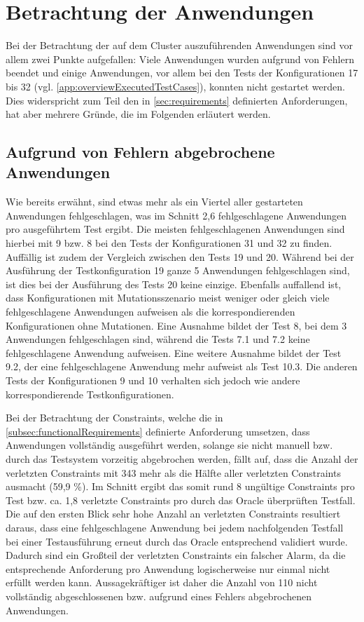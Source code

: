 \section{Betrachtung der Anwendungen}
\label{sec:appEval}

Bei der Betrachtung der auf dem Cluster auszuführenden Anwendungen sind vor allem zwei Punkte aufgefallen:
Viele Anwendungen wurden aufgrund von Fehlern beendet und einige Anwendungen, vor allem bei den Tests der Konfigurationen 17 bis 32 (vgl. \cref{app:overviewExecutedTestCases}), konnten nicht gestartet werden.
Dies widerspricht zum Teil den in \cref{sec:requirements} definierten Anforderungen, hat aber mehrere Gründe, die im Folgenden erläutert werden.

\subsection{Aufgrund von Fehlern abgebrochene Anwendungen}
\label{subsec:failedApps}

Wie bereits erwähnt, sind etwas mehr als ein Viertel aller gestarteten Anwendungen fehlgeschlagen, was im Schnitt 2,6 fehlgeschlagene Anwendungen pro ausgeführtem Test ergibt.
Die meisten fehlgeschlagenen Anwendungen sind hierbei mit 9 bzw. 8 bei den Tests der Konfigurationen 31 und 32 zu finden.
Auffällig ist zudem der Vergleich zwischen den Tests 19 und 20.
Während bei der Ausführung der Testkonfiguration 19 ganze 5 Anwendungen fehlgeschlagen sind, ist dies bei der Ausführung des Tests 20 keine einzige.
Ebenfalls auffallend ist, dass Konfigurationen mit Mutationsszenario meist weniger oder gleich viele fehlgeschlagene Anwendungen aufweisen als die korrespondierenden Konfigurationen ohne Mutationen.
Eine Ausnahme bildet der Test 8, bei dem 3 Anwendungen fehlgeschlagen sind, während die Tests 7.1 und 7.2 keine fehlgeschlagene Anwendung aufweisen.
Eine weitere Ausnahme bildet der Test 9.2, der eine fehlgeschlagene Anwendung mehr aufweist als Test 10.3. Die anderen Tests der Konfigurationen 9 und 10 verhalten sich jedoch wie andere korrespondierende Testkonfigurationen.

Bei der Betrachtung der Constraints, welche die in \cref{subsec:functionalRequirements} definierte Anforderung umsetzen, dass Anwendungen vollständig ausgeführt werden, solange sie nicht manuell bzw. durch das Testsystem vorzeitig abgebrochen werden, fällt auf, dass die Anzahl der verletzten Constraints mit 343 mehr als die Hälfte aller verletzten Constraints ausmacht (59,9 \%).
Im Schnitt ergibt das somit rund 8 ungültige Constraints pro Test bzw. ca. 1,8 verletzte Constraints pro durch das Oracle überprüften Testfall.
Die auf den ersten Blick sehr hohe Anzahl an verletzten Constraints resultiert daraus, dass eine fehlgeschlagene Anwendung bei jedem nachfolgenden Testfall bei einer Testausführung erneut durch das Oracle entsprechend validiert wurde.
Dadurch sind ein Großteil der verletzten Constraints ein falscher Alarm, da die entsprechende Anforderung pro Anwendung logischerweise nur einmal nicht erfüllt werden kann.
Aussagekräftiger ist daher die Anzahl von 110 nicht vollständig abgeschlossenen bzw. aufgrund eines Fehlers abgebrochenen Anwendungen.

